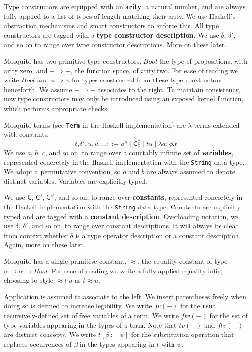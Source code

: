 \documentclass{llncs}
\newcommand{\deffont}[1]{\textbf{#1}}
\newcommand{\lam}[1]{\lambda{#1}.}
\newcommand{\tf}[1]{\mathsf{#1}}
\begin{document}
Type constructors are equipped with an \deffont{arity}, a natural number, and are always fully applied to a list of types of length matching their arity.
We use Haskell's abstraction mechanisms and smart constructors to enforce this.
All type constructors are tagged with a \deffont{type constructor description}.
We use $\delta$, $\delta'$, and so on to range over type constructor descriptions.
More on these later.

Mosquito has two primitive type constructors, $Bool$ the type of propositions, with arity zero, and $- \Rightarrow -$, the function space, of arity two.
For ease of reading we write $Bool$ and $\phi \Rightarrow \psi$ for types constructed from these type constructors henceforth.
We assume $- \Rightarrow -$ associates to the right.
To maintain consistency, new type constructors may only be introduced using an exposed kernel function, which performs appropriate checks.

Mosquito terms (see \texttt{Term} in the Haskell implementation) are $\lambda$-terms extended with constants:
\begin{displaymath}
t, t', u, v, \ldots ::= a^\phi \mid \tf{C}_\delta^\phi \mid tu \mid \lam{a{:}\phi}t
\end{displaymath}
We use $a$, $b$, $c$, and so on, to range over a countably infinite set of \deffont{variables}, represented concretely in the Haskell implementation with the \texttt{String} data type.
We adopt a permutative convention, so $a$ and $b$ are always assumed to denote distinct variables.
Variables are explicitly typed.

We use $\tf{C}$, $\tf{C}'$, $\tf{C}''$, and so on, to range over \deffont{constants}, represented concretely in the Haskell implementation with the \texttt{String} data type.
Constants are explicitly typed and are tagged with a \deffont{constant description}.
Overloading notation, we use $\delta$, $\delta'$, and so on, to range over constant descriptions.
It will always be clear from context whether $\delta$ is a type operator description or a constant description.
Again, more on these later.

Mosquito has a single primitive constant, $\approx$, the equality constant of type $\alpha \rightarrow \alpha \rightarrow Bool$.
For ease of reading we write a fully applied equality infix, choosing to style $\approx t\ u$ as $t \approx u$.

Application is assumed to associate to the left.
We insert parentheses freely when doing so is deemed to increase legibility.
We write $fv(-)$ for the usual recursively-defined set of free variables of a term.
We write $ftv(-)$ for the set of type variables appearing in the types of a term.
Note that $tv(-)$ and $ftv(-)$ are distinct concepts.
We write $t[\beta := \psi]$ for the substitution operation that replaces occurrences of $\beta$ in the types appearing in $t$ with $\psi$.
\end{document}
